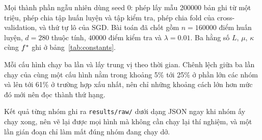 Mọi thành phần ngẫu nhiên dùng seed 0: phép lấy mẫu \num{200000} bản ghi từ một
triệu, phép chia tập huấn luyện và tập kiểm tra, phép chia fold của
cross-validation, và thứ tự lô của SGD. Bài toán đã chốt gồm $n = \num{160000}$
điểm huấn luyện, $d = 280$ thuộc tính, $\num{40000}$ điểm kiểm tra và
$\lambda = \num{0.01}$. Ba hằng số $L$, $\mu$, $\kappa$ cùng $f^{*}$ ghi ở
bảng~\ref{tab:constants}.

Mỗi cấu hình chạy ba lần và lấy trung vị theo thời gian. Chênh lệch giữa ba lần
chạy của cùng một cấu hình nằm trong khoảng 5\% tới 25\% ở phần lớn các nhóm và
lên tới 61\% ở trường hợp xấu nhất, nên chỉ những khoảng cách lớn hơn mức đó mới
nên đọc thành thứ hạng.

Kết quả từng nhóm ghi ra \texttt{results/raw/} dưới dạng JSON ngay khi nhóm ấy chạy
xong, nên vẽ lại được mọi hình mà không cần chạy lại thí nghiệm, và một lần gián
đoạn chỉ làm mất đúng nhóm đang chạy dở.
